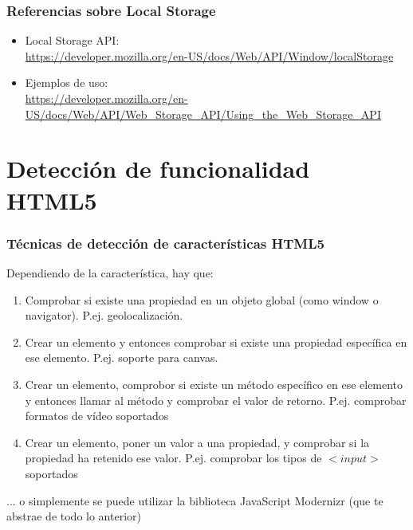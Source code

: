 
\begin{frame}
\frametitle{Referencias sobre Local Storage}

\begin{itemize}
  \item Local Storage API: \\ {\footnotesize \url{https://developer.mozilla.org/en-US/docs/Web/API/Window/localStorage}}
  \item Ejemplos de uso: \\ {\footnotesize \url{https://developer.mozilla.org/en-US/docs/Web/API/Web_Storage_API/Using_the_Web_Storage_API}}
\end{itemize}

\end{frame}



\section{Detección de funcionalidad HTML5}


\begin{frame}
\frametitle{Técnicas de detección de características HTML5}

Dependiendo de la característica, hay que:

\begin{enumerate}
  \item Comprobar si existe una propiedad en un objeto global (como window o navigator). P.ej. geolocalización.
  \item  Crear un elemento y entonces comprobar si existe una propiedad específica en ese elemento. P.ej. soporte para canvas.
  \item Crear un elemento, comprobor si existe un método específico en ese elemento y entonces llamar al método y comprobar el valor de retorno. P.ej. comprobar formatos de vídeo soportados
  \item Crear un elemento, poner un valor a una propiedad, y comprobar si la propiedad ha retenido ese valor. P.ej. comprobar los tipos de $<input>$ soportados
\end{enumerate}

... o simplemente se puede utilizar la biblioteca JavaScript Modernizr (que te abstrae de todo lo anterior)


\end{frame}

